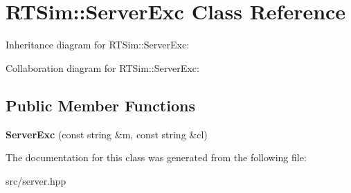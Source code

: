 \hypertarget{classRTSim_1_1ServerExc}{}\section{R\+T\+Sim\+:\+:Server\+Exc Class Reference}
\label{classRTSim_1_1ServerExc}


Inheritance diagram for R\+T\+Sim\+:\+:Server\+Exc\+:


Collaboration diagram for R\+T\+Sim\+:\+:Server\+Exc\+:
\subsection*{Public Member Functions}
\begin{DoxyCompactItemize}
\item 
{\bfseries Server\+Exc} (const string \&m, const string \&cl)\hypertarget{classRTSim_1_1ServerExc_a6a824cd0524fdcb9c559c502c1608bb6}{}\label{classRTSim_1_1ServerExc_a6a824cd0524fdcb9c559c502c1608bb6}

\end{DoxyCompactItemize}


The documentation for this class was generated from the following file\+:\begin{DoxyCompactItemize}
\item 
src/server.\+hpp\end{DoxyCompactItemize}
